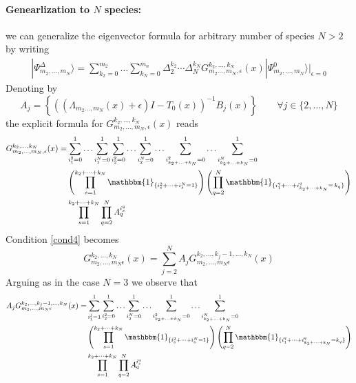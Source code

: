 \documentclass[11pt]{article}
\numberwithin{equation}{section}
\numberwithin{equation}{subsection}
\begin{document}
\paragraph{Genearlization to $N$ species:} we can generalize the eigenvector formula for arbitrary number of species $N>2$ by writing
\begin{equation}
	\begin{split}
	|\Psi_{m_{2},\ldots,m_{N}}^{\Delta}\rangle=\sum_{k_{2}=0}^{m_{2}}\ldots\sum_{k_{N}=0}^{m_{n}}\Delta_{2}^{k_{2}}\cdots\Delta_{N}^{k_{N}}G_{m_{2}\ldots,m_{N},\epsilon}^{k_{2},\ldots,k_{N}}(x)|\Psi_{m_{2},\ldots,m_{N}}^{0}\rangle|_{\epsilon=0}
	\end{split}
\end{equation}
Denoting by
\begin{equation}
A_{j}=	\left\{\left((\Lambda_{m_{2}\ldots,m_{N}}(x)+\epsilon)I-T_{0}(x)\right)^{-1}B_{j}(x)\right\}\qquad \forall j\in \{2,\ldots,N\}
\end{equation}
the explicit formula for $G_{m_{2},\ldots,m_{N},\epsilon}^{k_{2},\ldots,k_{N}}(x)$ reads
\begin{equation}
	\begin{split}
G_{m_{2},\ldots,m_{N},\epsilon}^{k_{2},\ldots,k_{N}}(x)=&\sum_{i_{1}^{2}=0}^{1}\ldots\sum_{i_{1}^{N}=0}^{1}\sum_{i_{2}^{2}=0}^{1}\ldots\sum_{i_{2}^{N}=0}^{1}\ldots\sum_{i_{k_{2}+\ldots+k_{N}}^{2}=0}^{1}\ldots \sum_{i_{k_{2}+\ldots+k_{N}}^{N}=0}^{1}
\\&
\left(\prod_{s=1}^{k_{2}+\cdots+k_{N}}\mathbbm{1}_{\{i_{s}^{2}+\cdots+i_{s}^{N}=1\}}\right)\left(\prod_{q=2}^{N}\mathbbm{1}_{\{i_{1}^{q}+\cdots+i_{k_{2}+\cdots+k_{N}}^{q}=\,k_{q}\}}\right)
\\&
\prod_{s=1}^{k_{2}+\cdots+k_{N}}\prod_{q=2}^{N}A_{q}^{i_{s}^{q}}
	\end{split}
\end{equation}
Condition \eqref{cond4} becomes
\begin{equation}\label{cond4General}
	G_{m_{2},\ldots,m_{N}\epsilon}^{k_{2},\ldots,k_{N}}(x)=\sum_{j=2}^{N}A_{j}G_{m_{2},\ldots,m_{N}\epsilon}^{k_{2},\ldots,k_{j}-1,\ldots,k_{N}}(x)
\end{equation}
Arguing as in the case $N=3$ we observe that 
\begin{equation}
	\begin{split}
		A_{j}G_{m_{2},\ldots,m_{N}\epsilon}^{k_{2},\ldots,k_{j}-1,\ldots,k_{N}}(x)=&\sum_{i_{1}^{j}=1}^{1}\sum_{i_{2}^{2}=0}^{1}\ldots\sum_{i_{2}^{N}=0}^{1}\ldots\sum_{i_{k_{2}+\ldots+k_{N}}^{2}=0}^{1}\ldots \sum_{i_{k_{2}+\ldots+k_{N}}^{N}=0}^{1}
	\\&
	\left(\prod_{s=1}^{k_{2}+\cdots+k_{N}}\mathbbm{1}_{\{i_{s}^{2}+\cdots+i_{s}^{N}=1\}}\right)\left(\prod_{q=2}^{N}\mathbbm{1}_{\{i_{1}^{q}+\cdots+i_{k_{2}+\cdots+k_{N}}^{q}=k_{q}\}}\right)
	\\&
	\prod_{s=1}^{k_{2}+\cdots+k_{N}}\prod_{q=2}^{N}A_{q}^{i_{s}^{q}}
	\end{split}
\end{equation}
\end{document}
